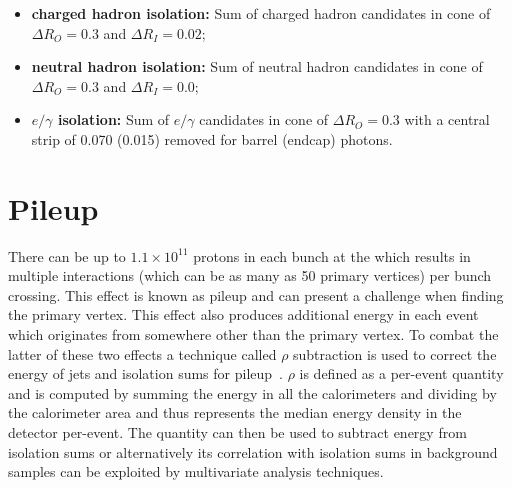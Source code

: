 \begin{itemize}
  \item{\textbf{charged hadron isolation:} Sum of charged hadron \PF candidates \ET in cone of $\Delta R_{O}=0.3$ and $\Delta R_{I}=0.02$;} 
  \item{\textbf{neutral hadron isolation:} Sum of neutral hadron \PF candidates \ET in cone of $\Delta R_{O}=0.3$ and $\Delta R_{I}=0.0$;}
  \item{\textbf{$e/\gamma$ isolation:} Sum of $e/\gamma$ \PF candidates \ET in cone of $\Delta R_{O}=0.3$ with a central \eta strip of 0.070 (0.015) removed for barrel (endcap) photons.}
\end{itemize}

\section{Pileup}
\label{sec:pileup}

There can be up to $1.1\times10^{11}$ protons in each bunch at the \LHC which results in multiple interactions (which can be as many as 50 primary vertices) per bunch crossing. This effect is known as pileup and can present a challenge when finding the primary vertex. This effect also produces additional energy in each event which originates from somewhere other than the primary vertex. To combat the latter of these two effects a technique called $\rho$ subtraction is used to correct the energy of jets and isolation sums for pileup~\cite{rho_sub}. $\rho$ is defined as a per-event quantity and is computed by summing the energy in all the calorimeters and dividing by the calorimeter area and thus represents the median energy density in the detector per-event. The quantity \rho can then be used to subtract energy from isolation sums or alternatively its correlation with isolation sums in background samples can be exploited by multivariate analysis techniques.




